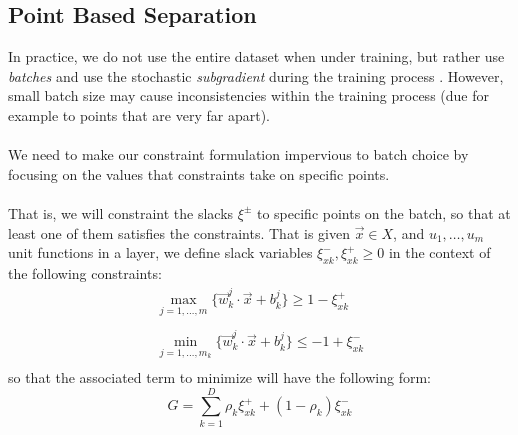 \subsection{Point Based Separation \SepPoint}

In practice, we do not use the entire dataset when under training, but rather use \emph{batches} and use the stochastic \emph{subgradient} during the training process \cite{LeCun06atutorial}. However, small batch size may cause inconsistencies within the training process (due for example to points that are very far apart). 
\\\\
We need to make our constraint formulation impervious to batch choice by focusing on the values that constraints take on specific points. 
\\\\
That is, we will constraint the slacks $\xi^{\pm}$ to specific points on the batch, so that at least one of them satisfies the constraints. That is given $\vec{x}\in X$, and $u_1,\ldots,u_m$ unit functions in a layer, we define slack variables $\xi^{-}_{xk},\xi^{+}_{xk}\geq 0$ in the context of the following constraints:
\begin{equation}\label{eq:pointSeparationConstraint}
\begin{array}{lcl}
    \displaystyle\max_{j=1,\ldots,m}\{\vec{w}^j_k\cdot\vec{x}+b^j_k\}\geq 1-\xi^{+}_{xk}\\\\
    \displaystyle\min_{j=1,\ldots,m_k}\{\vec{w}^j_k\cdot\vec{x}+b^j_k\}\leq -1+\xi^{-}_{xk}\\
\end{array}    
\end{equation}
so that the associated term to minimize will have the following form:
\begin{equation}\label{eq:constraintLossForLayerSeparation}
    G = \sum_{k=1}^{D}\rho_{k}\xi^{+}_{xk}+(1-\rho_{k})\xi^{-}_{xk}
\end{equation}
